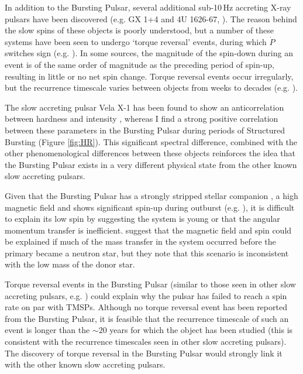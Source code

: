 \par In addition to the Bursting Pulsar, several additional sub-10\,Hz accreting X-ray pulsars have been discovered (e.g. GX 1+4 and 4U 1626-67, \citealp{Lewin_GX1,Rappaport_4U}). The reason behind the slow spins of these objects is poorly understood, but a number of these systems have been seen to undergo `torque reversal' events, during which $\dot{P}$ switches sign (e.g. \citealp{Chakrabarty_4U,Chakrabarty_GX14}). In some sources, the magnitude of the spin-down during an event is of the same order of magnitude as the preceding period of spin-up, resulting in little or no net spin change. Torque reversal events occur irregularly, but the recurrence timescale varies between objects from weeks to decades (e.g. \citealp{Bildsten_Rev}).
\par The slow accreting pulsar Vela X-1 has been found to show an anticorrelation between hardness and intensity \citep{Kreykenbohm_Vela}, whereas I find a strong positive correlation between these parameters in the Bursting Pulsar during periods of Structured Bursting (Figure \ref{fig:HR}). This significant spectral difference, combined with the other phenomenological differences between these objects reinforces the idea that the Bursting Pulsar exists in a very different physical state from the other known slow accreting pulsars.
\par Given that the Bursting Pulsar has a strongly stripped stellar companion \citep{Bildsten_Nuclear}, a high magnetic field and shows significant spin-up during outburst (e.g. \citealp{Finger_BP,Sanna_BP}), it is difficult to explain its low spin by suggesting the system is young or that the angular momentum transfer is inefficient. \citealp{Rappaport_BPHistory} suggest that the magnetic field and spin could be explained if much of the mass transfer in the system occurred before the primary became a neutron star, but they note that this scenario is inconsistent with the low mass of the donor star.
\par Torque reversal events in the Bursting Pulsar (similar to those seen in other slow accreting pulsars, e.g. \citealp{Bildsten_Rev}) could explain why the pulsar has failed to reach a spin rate on par with TMSPs.  Although no torque reversal event has been reported from the Bursting Pulsar, it is feasible that the recurrence timescale of such an event is longer than the $\sim20$ years for which the object has been studied (this is consistent with the recurrence timescales seen in other slow accreting pulsars). The discovery of torque reversal in the Bursting Pulsar would strongly link it with the other known slow accreting pulsars.


